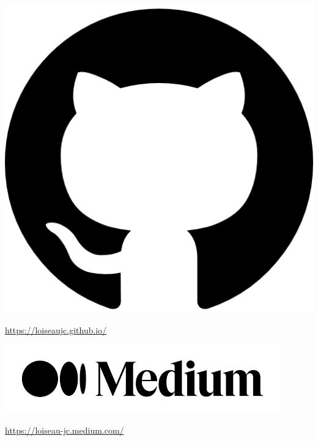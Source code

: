 \documentclass[aspectratio=169, usenames, dvipsnames]{beamer}
\begin{document}
{

  \begin{frame}
    \begin{minipage}{.28\textwidth}
      \centering
      \includegraphics[height=.15\textheight]{github}
    \end{minipage}%
    \hfill
    \begin{minipage}{.68\textwidth}
      \url{https://loiseaujc.github.io/}
    \end{minipage}

    \bigskip

    \begin{minipage}{.28\textwidth}
      \centering
      \includegraphics[width=\textwidth]{medium}
    \end{minipage}%
    \hfill
    \begin{minipage}{.68\textwidth}
      \url{https://loiseau-jc.medium.com/}
    \end{minipage}


\end{frame}}
\end{document}
